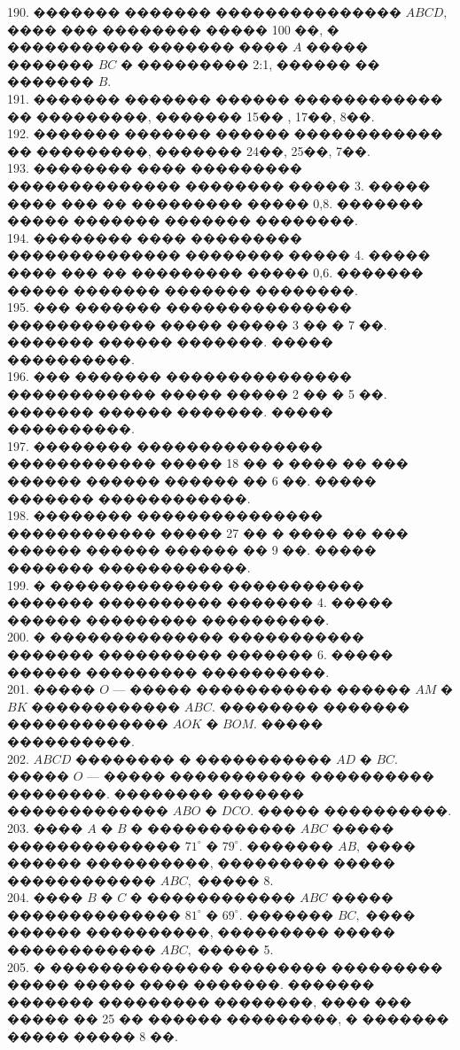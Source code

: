 \documentclass[12pt]{article}
\begin{document}
190. ������� ������� ��������������� $ABCD,$ ���� ��� �������� ����� 100 ��, � ����������� ������� ���� $A$ ����� ������� $BC$ � ��������� 2:1, ������ �� ������� $B.$\\
191. ������� ������� ������ ������������ �� ���������, ������� 15�� , 17��, 8��.\\
192. ������� ������� ������ ������������ �� ���������, ������� 24��, 25��, 7��.\\
193. �������� ���� ��������� �������������� �������� ����� 3. ����� ���� ��� �� ��������� ����� 0,8. ������� ����� ������� ������� ��������.\\
194. �������� ���� ��������� �������������� �������� ����� 4. ����� ���� ��� �� ��������� ����� 0,6. ������� ����� ������� ������� ��������.\\
195. ��� ������� ��������������� ������������ ����� ����� 3 �� � 7 ��. ������� ������ �������. ����� ����������.\\
196. ��� ������� ��������������� ������������ ����� ����� 2 �� � 5 ��. ������� ������ �������. ����� ����������.\\
197. �������� ��������������� ������������ ����� 18 �� � ���� �� ��� ������ ������ ������ �� 6 ��. ����� ������� ������������.\\
198. �������� ��������������� ������������ ����� 27 �� � ���� �� ��� ������ ������ ������ �� 9 ��. ����� ������� ������������.\\
199. � �������������� ����������� ������� ���������� ������� 4. ����� ������ ��������� ����������.\\
200. � �������������� ����������� ������� ���������� ������� 6. ����� ������ ��������� ����������.\\
201. ����� $O$ --- ����� ����������� ������ $AM$ � $BK$ ������������ $ABC.$ �������� ������� ������������� $AOK$ � $BOM.$ ����� ����������.\\
202. $ABCD$ �������� � ����������� $AD$ � $BC.$ ����� $O$ --- ����� ����������� ���������� ��������. �������� ������� ������������� $ABO$ � $DCO.$ ����� ����������.\\
203. ���� $A$ � $B$ � ������������ $ABC$ ����� �������������� $71^\circ$ � $79^\circ.$ ������� $AB,$ ���� ������ ����������, ��������� ����� ������������ $ABC,$ ����� 8.\\
204. ���� $B$ � $C$ � ������������ $ABC$ ����� �������������� $81^\circ$ � $69^\circ.$ ������� $BC,$ ���� ������ ����������, ��������� ����� ������������ $ABC,$ ����� 5.\\
205. � �������������� �������� ��������� ����� ����� ���� �������. ������� ������� ��������� ��������, ���� ��� ����� �� 25 �� ������ ���������, � ������� ����� ����� 8 ��.\\
\end{document}
